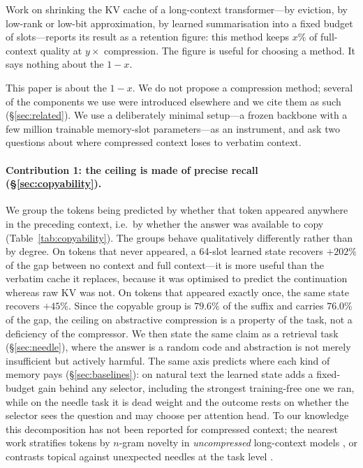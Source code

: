 \documentclass[11pt]{article}
\begin{document}
Work on shrinking the KV cache of a long-context transformer---by eviction, by
low-rank or low-bit approximation, by learned summarisation into a fixed budget
of slots---reports its result as a retention figure: this method keeps $x\%$ of
full-context quality at $y\times$ compression. The figure is useful for choosing
a method. It says nothing about the $1-x$.

This paper is about the $1-x$. We do not propose a compression method; several
of the components we use were introduced elsewhere and we cite them as such
(\S\ref{sec:related}). We use a deliberately minimal setup---a frozen backbone
with a few million trainable memory-slot parameters---as an instrument, and ask
two questions about where compressed context loses to verbatim context.

\paragraph{Contribution 1: the ceiling is made of precise recall
(\S\ref{sec:copyability}).}
We group the tokens being predicted by whether that token appeared anywhere in
the preceding context, i.e.\ by whether the answer was available to copy
(Table~\ref{tab:copyability}). The
groups behave qualitatively differently rather than by degree. On tokens that
never appeared, a 64-slot learned state recovers $+202\%$ of the gap between no
context and full context---it is more useful than the verbatim cache it replaces,
because it was optimised to predict the continuation whereas raw KV was not. On
tokens that appeared exactly once, the same state recovers $+45\%$. Since the
copyable group is $79.6\%$ of the suffix and carries $76.0\%$ of the gap, the
ceiling on abstractive compression is a property of the task, not a deficiency
of the compressor. We then state the same claim as a retrieval task
(\S\ref{sec:needle}), where the answer is a random code and abstraction is not
merely insufficient but actively harmful. The same axis predicts where each
kind of memory pays (\S\ref{sec:baselines}): on natural text the learned state
adds a fixed-budget gain behind any selector, including the strongest
training-free one we ran, while on the needle task it is dead weight and the
outcome rests on whether the selector sees the question and may choose per
attention head. To our knowledge this decomposition has not been reported for
compressed context; the nearest work stratifies tokens by $n$-gram novelty in
\emph{uncompressed} long-context models \citep{tokensbenefit}, or contrasts
topical against unexpected needles at the task level \citep{gistboundary}.
\end{document}
